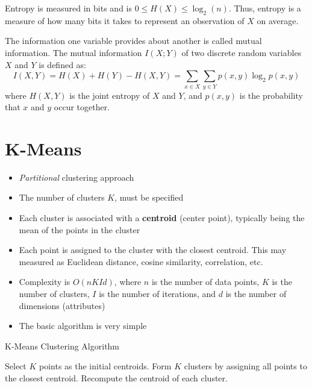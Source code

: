 Entropy is measured in bits and is $0 \leq H(X) \leq \log_2(n)$. Thus, entropy is a measure of how many bits it takes to represent an observation of $X$ on average.

The information one variable provides about another is called mutual information.
The mutual information $I(X;Y)$ of two discrete random variables $X$ and $Y$ is defined as:
\[
I(X,Y) = H(X) + H(Y) - H(X,Y) = \sum_{x \in X} \sum_{y \in Y} p(x,y) \log_2p(x,y)
\]
where $H(X,Y)$ is the joint entropy of $X$ and $Y$, and $p(x,y)$ is the probability that $x$ and $y$ occur together.

\section{K-Means}
\begin{itemize}
	\item \textit{Partitional} clustering approach
	\item The number of clusters $K$, must be specified
	\item Each cluster is associated with a \textbf{centroid} (center point), typically being the mean of the points in the cluster
	\item Each point is assigned to the cluster with the closest centroid. This may measured as Euclidean distance, cosine similarity, correlation, etc.
	\item Complexity is $O(nKId)$, where $n$ is the number of data points, $K$ is the number of clusters, $I$ is the number of iterations, and $d$ is the number of dimensions (attributes)
	\item The basic algorithm is very simple
\end{itemize}

\begin{algorithm}[H]
\caption{K-Means Clustering Algorithm}
\begin{algorithmic}[1]
\State Select $K$ points as the initial centroids.
\Repeat
\State Form $K$ clusters by assigning all points to the closest centroid.
\State Recompute the centroid of each cluster.
\end{algorithmic}
\end{algorithm}


